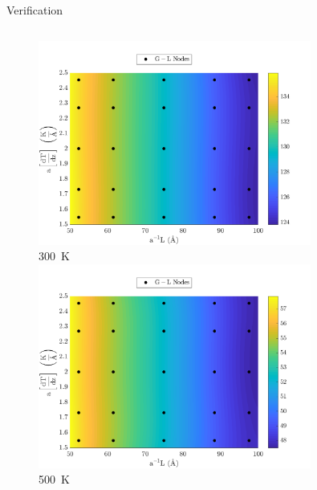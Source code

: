 \documentclass[xcolor={x11names,table},compress,svgnames,mathserif]{beamer}
\renewcommand{\(}{\begin{columns}}
\renewcommand{\)}{\end{columns}}
\newcommand{\<}[1]{\begin{column}{#1}}
\renewcommand{\>}{\end{column}}
\begin{document}
\begin{frame}{Verification}
\begin{columns}
\begin{column}{0.5\textwidth}
\begin{center}
\begin{figure}[htbp]
\vspace{-3mm}
  \includegraphics[width=0.8\textwidth]{./Figures/err2D_300}
  \\ \tiny{300~K} \vspace{1mm} \\
  \includegraphics[width=0.8\textwidth]{./Figures/err2D_500}
  \\ \tiny{500~K}
\end{figure}
\end{center}

\end{column}
\end{columns}

\end{frame}

\end{document}
